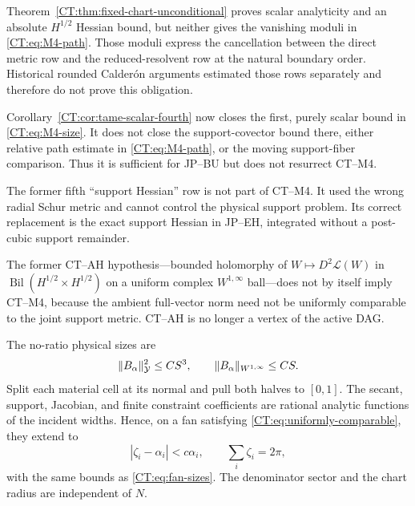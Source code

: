 \begin{remark}
Theorem~\ref{CT:thm:fixed-chart-unconditional} proves scalar analyticity and
an absolute $H^{1/2}$ Hessian bound, but neither gives the vanishing moduli
in \eqref{CT:eq:M4-path}.  Those moduli express the cancellation between the
direct metric row and the reduced-resolvent row at the natural boundary
order.  Historical rounded Calder\'on arguments estimated those rows
separately and therefore do not prove this obligation.

Corollary~\ref{CT:cor:tame-scalar-fourth} now closes the first, purely scalar
bound in \eqref{CT:eq:M4-size}.  It does not close the support-covector bound
there, either relative path estimate in \eqref{CT:eq:M4-path}, or the moving
support-fiber comparison.  Thus it is sufficient for JP--BU but does not
resurrect CT--M4.

The former fifth ``support Hessian'' row is not part of CT--M4.  It used the
wrong radial Schur metric and cannot control the physical support problem.
Its correct replacement is the exact support Hessian in JP--EH, integrated
without a post-cubic support remainder.

The former CT--AH hypothesis---bounded holomorphy of
$W\mapsto D^2\mathcal L(W)$ in
$\operatorname {Bil}(H^{1/2}\times H^{1/2})$ on a uniform complex
$W^{1,\infty}$ ball---does not by itself imply CT--M4, because the ambient
full-vector norm need not be uniformly comparable to the joint support
metric.  CT--AH is no longer a vertex of the active DAG.
\end{remark}

The no-ratio physical sizes are
\begin{equation}\label{CT:eq:fan-sizes}
 \|B_\alpha\|_\mathcal Y^2\le CS^3,\qquad
 \|B_\alpha\|_{W^{1,\infty}}\le CS.
\end{equation}
Split each material cell at its normal and pull both halves to $[0,1]$.
The secant, support, Jacobian, and finite constraint coefficients are
rational analytic functions of the incident widths.  Hence, on a fan
satisfying \eqref{CT:eq:uniformly-comparable}, they extend to
\begin{equation}\label{CT:eq:material-polydisc}
 |\zeta_i-\alpha_i|<c\alpha_i,\qquad
 \sum_i\zeta_i=2\pi,
\end{equation}
with the same bounds as \eqref{CT:eq:fan-sizes}.  The denominator sector and
the chart radius are independent of $N$.

